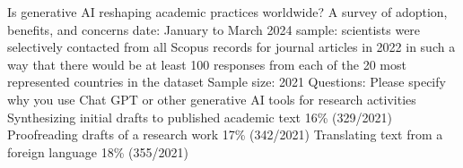 \cite{Mohammadi2026} Is generative AI reshaping academic practices worldwide? A
survey of adoption, benefits, and concerns
date: January to March 2024
sample: scientists were selectively contacted from all Scopus records for journal articles in 2022 in such a way that there would be at least 100 responses from each of the 20 most represented countries in the dataset
Sample size: 2021
Questions: 
Please specify why you use Chat GPT or other generative AI tools for research activities
Synthesizing initial drafts to published academic text 16\% (329/2021)
Proofreading drafts of a research work 17\% (342/2021)
Translating text from a foreign language 18\% (355/2021)